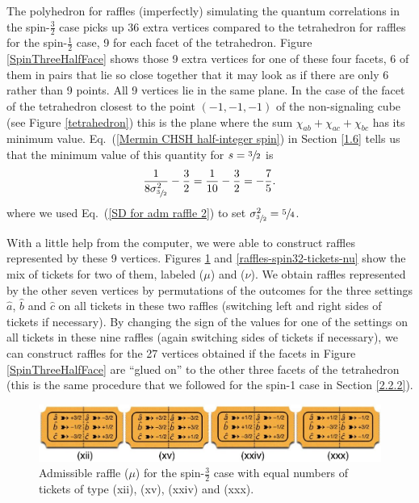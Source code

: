 The polyhedron for raffles (imperfectly) simulating the quantum correlations in the spin-$\frac32$ case picks up 36 extra vertices compared to the tetrahedron for raffles for the spin-$\frac12$ case, 9 for each facet of the tetrahedron. Figure \ref{SpinThreeHalfFace} shows those 9 extra vertices for one of these four facets, 6 of them in pairs that lie so close together that it may look as if there are only 6 rather than 9 points. All 9 vertices lie in the same plane. In the case of the facet of the tetrahedron closest to the point $(-1, -1, -1)$ of the non-signaling cube (see Figure \ref{tetrahedron}) this is the plane where the sum $\chi_{ab} + \chi_{ac} + \chi_{bc}$ has its minimum value. Eq.\ (\ref{Mermin CHSH half-integer spin}) in Section \ref{1.6} tells us that the minimum value of this quantity for $s = \sfrac32$ is
\begin{equation}
 \frac{1}{8\sigma_{\sfrac32}^2} - \frac32 = \frac{1}{10} - \frac32 = -\frac75.
\end{equation}
where we used Eq.\ (\ref{SD for adm raffle 2}) to set $\sigma_{\sfrac32}^2 = \sfrac54$.

With a little help from the computer, we were able to construct raffles represented by these 9 vertices. Figures \ref{raffles-spin32-tickets-mu} and \ref{raffles-spin32-tickets-nu} show the mix of tickets for two of them, labeled ($\mu$) and ($\nu$). We obtain raffles represented by the other seven vertices by permutations of the outcomes for the three settings $\hat{a}$, $\hat{b}$ and $\hat{c}$ on all tickets in these two raffles (switching left and right sides of tickets if necessary). By changing the sign of the values for one of the settings on all tickets in these nine raffles (again switching sides of tickets if necessary), we can construct raffles for the 27 vertices obtained if the facets in Figure \ref{SpinThreeHalfFace} are ``glued on'' to the other three facets of the tetrahedron (this is the same procedure that we followed for the spin-1 case in Section \ref{2.2.2}).

\begin{figure}[ht]
 \centering
   \includegraphics[width=4.5in]{raffles-spin32-tickets-mu.jpeg} 
   \caption{Admissible raffle ($\mu$) for the spin-$\frac32$ case with equal numbers of tickets of type (xii), (xv), (xxiv) and (xxx).}
    \label{raffles-spin32-tickets-mu}
\end{figure}

